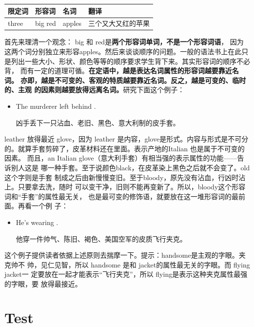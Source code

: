 \begin{longtable}[]{@{}llll@{}}
  \toprule\noalign{}
  限定词 & 形容词 & 名词 & 翻译 \\
  \midrule\noalign{}
  \endhead
  \bottomrule\noalign{}
  \endlastfoot
  three & big red & apples & 三个又大又红的苹果 \\
\end{longtable}

首先来理清一个观念： big 和 red是\textbf{两个形容词单词，不是一个形容词语}，
因为这两个词分别独立来形容apples。然后来谈谈顺序的问题。一般的语法书上在此只
是列出一些大小、形状、颜色等等的顺序要求学生背下来。其实形容词的顺序不必背，
而有一定的道理可循。\textbf{在定语中，越是表达名词属性的形容词越要靠近名词。
  亦即，越是不可变的、客观的特质越要靠近名词。反之，越是可变的、临时的、主观
  的因素则越要放得远离名词。}研究下面这个例子：

\begin{itemize}
\item The murderer left behind .

  凶手丢下一只沾血、老旧、黑色、意大利制的皮手套。
\end{itemize}

leather 放得最近 glove，因为 leather 是内容，glove是形式。内容与形式是不可分
的。就算手套剪碎了，皮革材料还在里面。表示产地的Italian 也是属于不可变的因素。
而且，an Italian glove（意大利手套）有相当强的表示属性的功能——告诉别人这是
哪一种手套。至于说颜色black，在皮革染上黑色之后就不会变了。old这个字则是手套
制成之后由新慢慢变旧。至于bloody，原先没有沾血，行凶时沾上。只要拿去洗，随时
可以变干净，旧则不能再变新了。所以，bloody这个形容词和“手套”的属性最无关，
也是最可变的修饰语，就要放在这一堆形容词的最前面。再看一个例
子：
\begin{itemize}
\item He's wearing .

  他穿一件帅气、陈旧、褐色、美国空军的皮质飞行夹克。
\end{itemize}

这个例子提供读者依据上述原则去揣摩一下。提示：handsome是主观的字眼。夹克帅不
帅，见仁见智，所以 handsome 是和 jacket的属性最无关的字眼。而 flying jacket一
定要放在一起才能表示“飞行夹克”，所以 flying是表示这种夹克属性最强的字眼，要
放得最接近。



\section{Test}

